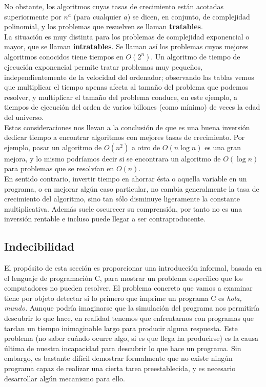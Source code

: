 No obstante, los algoritmos cuyas tasas de crecimiento están acotadas superiormente por $n^a$ (para cualquier $a$) se dicen, en conjunto, de complejidad polinomial, y los problemas que resuelven se llaman \textbf{tratables}.\\

La situación es muy distinta para los problemas de complejidad exponencial o mayor, que se llaman \textbf{intratables}. Se llaman así los problemas cuyos mejores algoritmos conocidos tiene tiempos en $O(2^n)$. Un algoritmo de tiempo de ejecución exponencial permite tratar problemas muy pequeños, independientemente de la velocidad del ordenador; observando las tablas vemos que multiplicar el tiempo apenas afecta al tamaño del problema que podemos resolver, y multiplicar el tamaño del problema conduce, en este ejemplo, a tiempos de ejecución del orden de varios billones (como mínimo) de veces la edad del universo.\\

Estas consideraciones nos llevan a la conclusión de que es una buena inversión dedicar tiempo a encontrar algoritmos con mejores tasas de crecimiento. Por ejemplo, pasar un algoritmo de $O(n^2)$ a otro de $O(n \log n)$ es una gran mejora, y lo mismo podríamos decir si se encontrara un algoritmo de $O(\log n)$ para problemas que se resolvían en $O(n)$.\\

En sentido contrario, invertir tiempo en ahorrar ésta o aquella variable en un programa, o en mejorar algún caso particular, no cambia generalmente la tasa de crecimiento del algoritmo, sino tan sólo disminuye ligeramente la constante multiplicativa. Además suele oscurecer su comprensión, por tanto no es una inversión rentable e incluso puede llegar a ser contraproducente. \\

\subsection{Indecibilidad}

El propósito de esta sección es proporcionar una introducción informal, basada en el lenguaje de programación C, para mostrar un problema específico que los computadores no pueden resolver. El problema concreto que vamos a examinar tiene por objeto detectar si lo primero que imprime un programa C es \emph{hola, mundo}. Aunque podría imaginarse que la simulación del programa nos permitiría descubrir lo que hace, en realidad tenemos que enfrentarnos con programas que tardan un tiempo inimaginable largo para producir alguna respuesta. Este problema (no saber cuándo ocurre algo, si es que llega ha producirse) es la causa última de nuestra incapacidad para descubrir lo que hace un programa. Sin embargo, es bastante difícil demostrar formalmente que no existe ningún programa capaz de realizar una cierta tarea preestablecida, y es necesario desarrollar algún mecanismo para ello.

